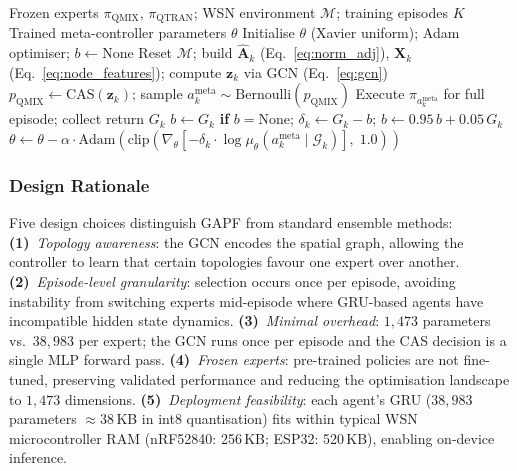 \documentclass[12pt, onecolumn, journal]{IEEEtran}
\begin{document}
\begin{algorithm}[H]
\caption{GAPF Training (CAS Mode)}
\label{alg:gapf_training}
\begin{algorithmic}[1]
\REQUIRE Frozen experts $\pi_{\text{QMIX}}$, $\pi_{\text{QTRAN}}$; WSN environment $\mathcal{M}$; training episodes $K$
\ENSURE Trained meta-controller parameters $\theta$
\STATE Initialise $\theta$ (Xavier uniform); Adam optimiser; $b \leftarrow \text{None}$
    \STATE Reset $\mathcal{M}$; build $\hat{\mathbf{A}}_k$ (Eq.~\ref{eq:norm_adj}), $\mathbf{X}_k$ (Eq.~\ref{eq:node_features}); compute $\mathbf{z}_k$ via GCN (Eq.~\ref{eq:gcn})
    \STATE $p_{\text{QMIX}} \leftarrow \text{CAS}(\mathbf{z}_k)$; \; sample $a^{\text{meta}}_k \sim \text{Bernoulli}(p_{\text{QMIX}})$
    \STATE Execute $\pi_{a^{\text{meta}}_k}$ for full episode; collect return $G_k$
    \STATE $b \leftarrow G_k$ \textbf{if} $b = \text{None}$; \; $\delta_k \leftarrow G_k - b$; \; $b \leftarrow 0.95\,b + 0.05\,G_k$
        \STATE $\theta \leftarrow \theta - \alpha \cdot \text{Adam}(\text{clip}(\nabla_\theta[-\delta_k \cdot \log \mu_\theta(a^{\text{meta}}_k \mid \mathcal{G}_k)],\; 1.0))$
    \ENDIF
\ENDFOR
\end{algorithmic}
\end{algorithm}


\subsubsection{Design Rationale}
\label{sec:gapf_rationale}

Five design choices distinguish GAPF from standard ensemble methods: \textbf{(1)}~\emph{Topology awareness}: the GCN encodes the spatial graph, allowing the controller to learn that certain topologies favour one expert over another. \textbf{(2)}~\emph{Episode-level granularity}: selection occurs once per episode, avoiding instability from switching experts mid-episode where GRU-based agents have incompatible hidden state dynamics. \textbf{(3)}~\emph{Minimal overhead}: $1{,}473$ parameters vs.\ $38{,}983$ per expert; the GCN runs once per episode and the CAS decision is a single MLP forward pass. \textbf{(4)}~\emph{Frozen experts}: pre-trained policies are not fine-tuned, preserving validated performance and reducing the optimisation landscape to $1{,}473$ dimensions. \textbf{(5)}~\emph{Deployment feasibility}: each agent's GRU ($38{,}983$ parameters $\approx 38$\,KB in int8 quantisation) fits within typical WSN microcontroller RAM (nRF52840: 256\,KB; ESP32: 520\,KB), enabling on-device inference.
\end{document}

